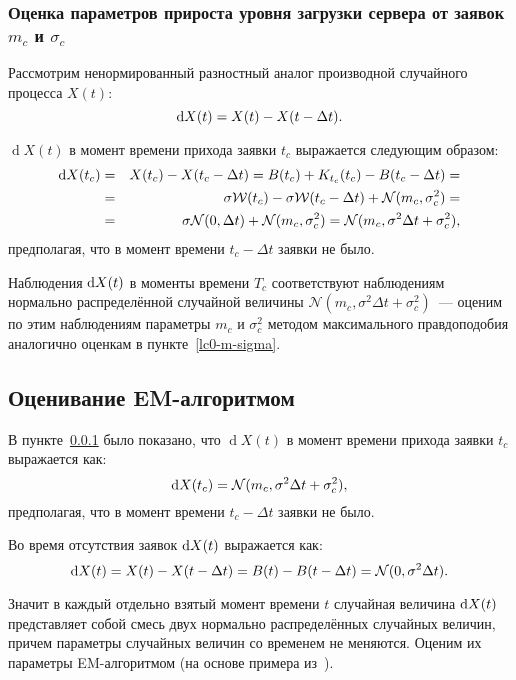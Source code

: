 \documentclass[a4paper,10pt]{article}
\begin{document}
\subsubsection{Оценка параметров прироста уровня загрузки сервера от заявок %
$m_c$ и $\sigma_c$}%
\label{lc0-mc-sigmac}
Рассмотрим ненормированный разностный аналог производной 
случайного процесса $X(t)$:
$$\dif X(t) = X(t) - X(t - \Delta t).$$

$\operatorname{d}X(t)$ в момент времени прихода заявки $t_c$ 
выражается следующим образом:
\begin{eqnarray*}
\dif X(t_c) 
  & = & X(t_c) - X(t_c - \Delta t) = 
      B(t_c) + K_{t_c}(t_c) - B(t_c - \Delta t) = \\
  & = & \sigma \mathcal{W}(t_c) - \sigma \mathcal{W}(t_c - \Delta t) + 
      \mathcal{N}(m_c, \sigma_c^2) = \\
  & = & \sigma \mathcal{N}(0, \Delta t) + \mathcal{N}(m_c, \sigma_c^2) =
      \mathcal{N}(m_c, \sigma^2 \Delta t + \sigma_c^2),
\end{eqnarray*}
предполагая, что в момент времени $t_c - \Delta t$ заявки не было.

Наблюдения $\dif X(t)$ в моменты времени $T_c$ соответствуют наблюдениям 
нормально распределённой случайной величины 
$\mathcal{N}(m_c, \sigma^2 \Delta t + \sigma_c^2)$~--- 
оценим по этим наблюдениям параметры $m_c$ и $\sigma_c^2$ 
методом максимального правдоподобия аналогично оценкам в 
пункте~\ref{lc0-m-sigma}.

\subsection{Оценивание EM-алгоритмом}
В пункте~\ref{lc0-mc-sigmac} было показано, 
что $\operatorname{d}X(t)$ в момент времени прихода заявки $t_c$ 
выражается как:
$$
  \dif X(t_c) = \mathcal{N}(m_c, \sigma^2 \Delta t + \sigma_c^2),
$$
предполагая, что в момент времени $t_c - \Delta t$ заявки не было.

Во время отсутствия заявок $\dif X(t)$ выражается как:
$$
\dif X(t) = X(t) - X(t - \Delta t) = 
    B(t) - B(t - \Delta t) =
    \mathcal{N}(0, \sigma^2 \Delta t).
$$

Значит в каждый отдельно взятый момент времени $t$ 
случайная величина $\dif X(t)$ представляет собой смесь двух нормально 
распределённых случайных величин, 
причем параметры случайных величин со временем не меняются.
Оценим их параметры EM-алгоритмом 
(на основе примера из~\cite{wiki:em-algorithm}).
\end{document}
